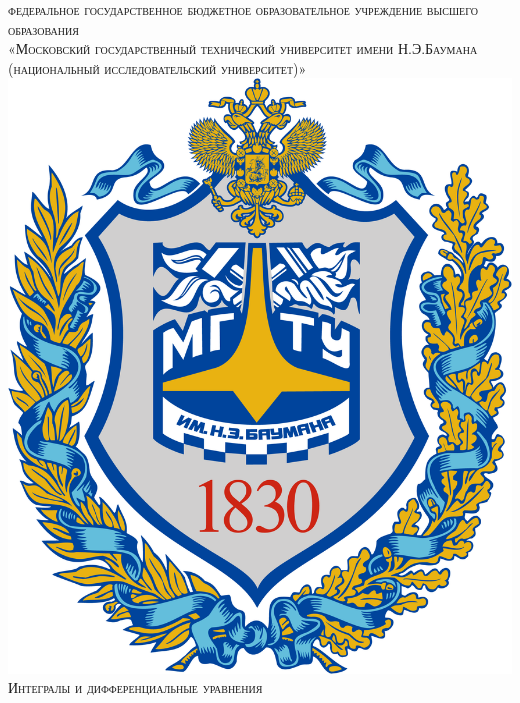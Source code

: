 \documentclass[12pt]{article}
\begin{document}
\begin{titlepage}

\newcommand{\HRule}{\rule{\linewidth}{0.5mm}} %

\center %
 

\textsc{федеральное государственное бюджетное образовательное учреждение высшего образования}\\
\textsc{\LARGE «Московский государственный технический университет имени Н.Э.Баумана }\\
\textsc{(национальный исследовательский университет)»}\\[0.5 cm]
\includegraphics[scale=.07]{Gerb_BMSTU.png}\\[2cm] 
\textsc{\Large Интегралы и дифференциальные уравнения}\\[0.5cm]


\end{titlepage}
\end{document}
